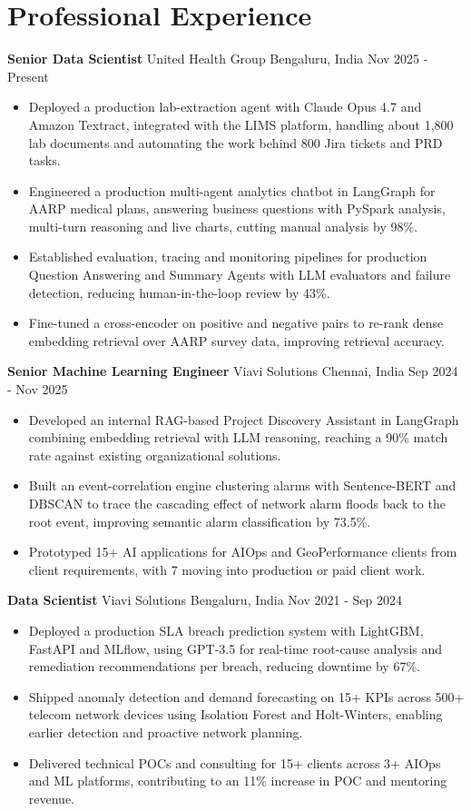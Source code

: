 \documentclass[10pt,a4paper]{article}
\newcommand{\role}[4]{\textbf{#1} \textbar{} #2 \hfill #3 \textbar{} #4\par}
\begin{document}
\section{Professional Experience}
\role{Senior Data Scientist}{United Health Group}{Bengaluru, India}{Nov 2025 - Present}
\begin{itemize}
  \item Deployed a production lab-extraction agent with Claude Opus 4.7 and Amazon Textract, integrated with the LIMS platform, handling about 1,800 lab documents and automating the work behind 800 Jira tickets and PRD tasks.
  \item Engineered a production multi-agent analytics chatbot in LangGraph for AARP medical plans, answering business questions with PySpark analysis, multi-turn reasoning and live charts, cutting manual analysis by 98\%.
  \item Established evaluation, tracing and monitoring pipelines for production Question Answering and Summary Agents with LLM evaluators and failure detection, reducing human-in-the-loop review by 43\%.
  \item Fine-tuned a cross-encoder on positive and negative pairs to re-rank dense embedding retrieval over AARP survey data, improving retrieval accuracy.
\end{itemize}
\vspace{3pt}
\role{Senior Machine Learning Engineer}{Viavi Solutions}{Chennai, India}{Sep 2024 - Nov 2025}
\begin{itemize}
  \item Developed an internal RAG-based Project Discovery Assistant in LangGraph combining embedding retrieval with LLM reasoning, reaching a 90\% match rate against existing organizational solutions.
  \item Built an event-correlation engine clustering alarms with Sentence-BERT and DBSCAN to trace the cascading effect of network alarm floods back to the root event, improving semantic alarm classification by 73.5\%.
  \item Prototyped 15+ AI applications for AIOps and GeoPerformance clients from client requirements, with 7 moving into production or paid client work.
\end{itemize}
\vspace{3pt}
\role{Data Scientist}{Viavi Solutions}{Bengaluru, India}{Nov 2021 - Sep 2024}
\begin{itemize}
  \item Deployed a production SLA breach prediction system with LightGBM, FastAPI and MLflow, using GPT-3.5 for real-time root-cause analysis and remediation recommendations per breach, reducing downtime by 67\%.
  \item Shipped anomaly detection and demand forecasting on 15+ KPIs across 500+ telecom network devices using Isolation Forest and Holt-Winters, enabling earlier detection and proactive network planning.
  \item Delivered technical POCs and consulting for 15+ clients across 3+ AIOps and ML platforms, contributing to an 11\% increase in POC and mentoring revenue.
\end{itemize}
\end{document}
